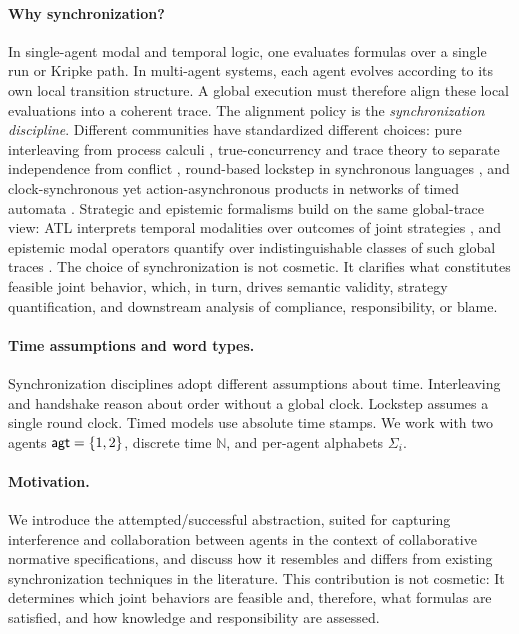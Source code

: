 \documentclass{article}
\begin{document}
  \paragraph{Why synchronization?}
  In single-agent modal and temporal logic, one evaluates formulas over a single run or Kripke path. In multi-agent systems, each agent evolves according to its own local transition structure. A global execution must therefore align these local evaluations into a coherent trace. The alignment policy is the \emph{synchronization discipline}. Different communities have standardized different choices: pure interleaving from process calculi \cite{Milner89,Hoare85}, true-concurrency and trace theory to separate independence from conflict \cite{DiekertRozenberg95}, round-based lockstep in synchronous languages \cite{Halbwachs93}, and clock-synchronous yet action-asynchronous products in networks of timed automata \cite{AlurDill94}. Strategic and epistemic formalisms build on the same global-trace view: ATL interprets temporal modalities over outcomes of joint strategies \cite{AlurHenzingerKupferman02}, and epistemic modal operators quantify over indistinguishable classes of such global traces \cite{fagin1995reasoning}. The choice of synchronization is not cosmetic. It clarifies what constitutes feasible joint behavior, which, in turn, drives semantic validity, strategy quantification, and downstream analysis of compliance, responsibility, or blame.
  
  \paragraph{Time assumptions and word types.}
  Synchronization disciplines adopt different assumptions about time. Interleaving and handshake reason about order without a global clock. Lockstep assumes a single round clock. Timed models use absolute time stamps. We work with two agents \(\mathsf{agt}=\{1,2\}\), discrete time \(\mathbb{N}\), and per-agent alphabets \(\Sigma_i\).  
  
  
  \paragraph{Motivation.}
  We introduce the attempted/successful abstraction, suited for capturing interference and collaboration between agents in the context of collaborative normative specifications, and discuss how it resembles and differs from existing synchronization techniques in the literature.
   This contribution is not cosmetic:
  It determines which joint behaviors are feasible and, therefore, what formulas are satisfied,
   and how knowledge and responsibility are assessed.
  
\end{document}

